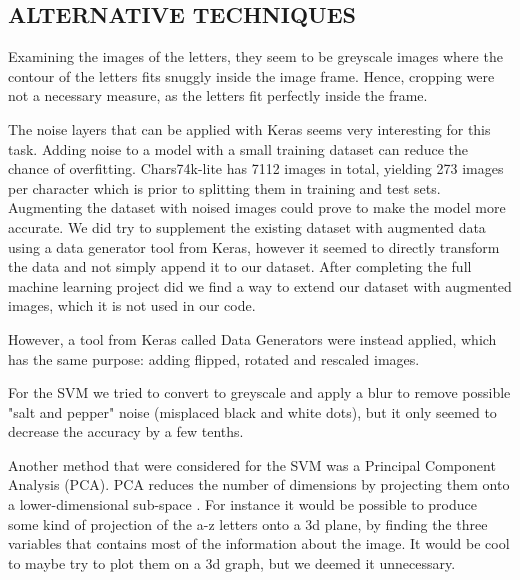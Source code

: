 \subsection{ALTERNATIVE TECHNIQUES}

Examining the images of the letters, they seem to be greyscale images where the contour of the letters fits snuggly inside the image frame. Hence, cropping were not a necessary measure, as the letters fit perfectly inside the frame.

The noise layers that can be applied with Keras seems very interesting for this task. Adding noise to a model with a small training dataset can reduce the chance of overfitting. Chars74k-lite has 7112 images in total, yielding 273 images per character which is prior to splitting them in training and test sets. Augmenting the dataset with noised images could prove to make the model more accurate. We did try to supplement the existing dataset with augmented data using a data generator tool from Keras, however it seemed to directly transform the data and not simply append it to our dataset. After completing the full machine learning project did we find a way to extend our dataset with augmented images, which it is not used in our code.

However, a tool from Keras called Data Generators were instead applied, which has the same purpose:  adding flipped, rotated and rescaled images. 

For the SVM we tried to convert to greyscale and apply a blur to remove possible "salt and pepper" noise (misplaced black and white dots), but it only seemed to decrease the accuracy by a few tenths.

Another method that were considered for the SVM was a Principal Component Analysis (PCA). PCA reduces the number of dimensions by projecting them onto a lower-dimensional sub-space \cite{scikit-learn}. For instance it would be possible to produce some kind of projection of the a-z letters onto a 3d plane, by finding the three variables that contains most of the information about the image. It would be cool to maybe try to plot them on a 3d graph, but we deemed it unnecessary.

